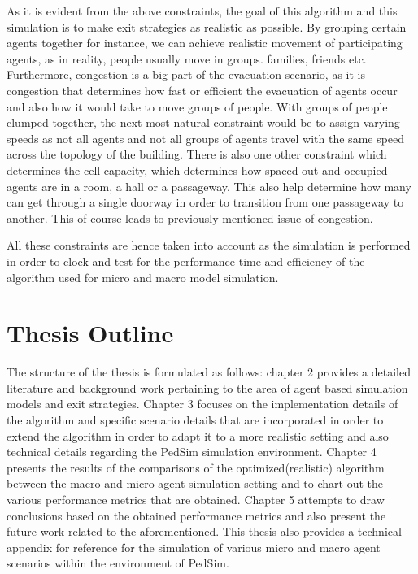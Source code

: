 As it is evident from the above constraints, the goal of this algorithm and this simulation is to make exit strategies as realistic as possible. By grouping certain agents together for instance, we can achieve realistic movement of participating agents, as in reality, people usually move in groups. families, friends etc. Furthermore, congestion is a big part of the evacuation scenario, as it is congestion that determines how fast or efficient the evacuation of agents occur and also how it would take to move groups of people. With groups of people clumped together, the next most natural constraint would be to assign varying speeds as not all agents and not all groups of agents travel with the same speed across the topology of the building. There is also one other constraint which determines the cell capacity, which determines how spaced out and occupied agents are in a room, a hall or a passageway. This also help determine how many can get through a single doorway in order to transition from one passageway to another. This of course leads to previously mentioned issue of congestion. 

All these constraints are hence taken into account as the simulation is performed in order to clock and test for the performance time and efficiency of the algorithm used for micro and macro model simulation.

\section{Thesis Outline}
\label{sec:intro:Thesis Outline}

The structure of the thesis is formulated as follows: chapter 2 provides a detailed literature and background work pertaining to the area of agent based simulation models and exit strategies. Chapter 3 focuses on the implementation details of the algorithm and specific scenario details that are incorporated in order to extend the algorithm in order to adapt it to a more realistic setting and also technical details regarding the PedSim simulation environment. Chapter 4 presents the results of the comparisons of the optimized(realistic) algorithm between the macro and micro agent simulation setting and to chart out the various performance metrics that are obtained. Chapter 5 attempts to draw conclusions based on the obtained performance metrics and also present the future work related to the aforementioned. This thesis also provides a technical appendix for reference for the simulation of various micro and macro agent scenarios within the environment of PedSim.